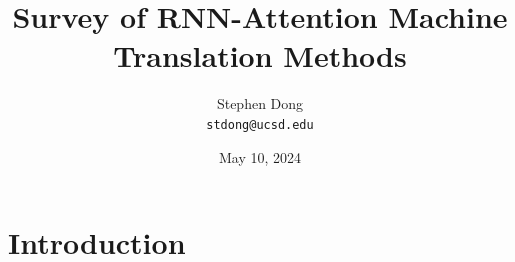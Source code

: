 \documentclass[11pt,a4paper]{article}
\title{Survey of RNN-Attention Machine Translation Methods}
\author{Stephen Dong  \\
  {\tt stdong@ucsd.edu} \\}
\date{May 10, 2024}
\begin{document}
\maketitle


 
          

\section{Introduction}


\end{document}
